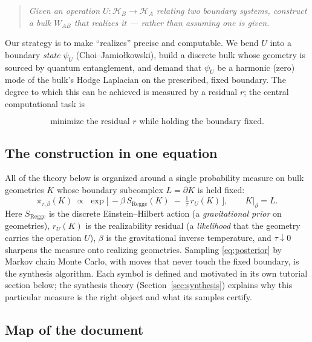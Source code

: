 \documentclass[11pt]{article}
\newcommand{\HH}{\mathcal{H}}
\newcommand{\bd}{\partial}
\theoremstyle{definition}
\theoremstyle{plain}
\begin{document}
\begin{quote}
\itshape Given an operation $U:\HH_B\to\HH_A$ relating two boundary systems, construct a
bulk $W_{AB}$ that realizes it --- rather than assuming one is given.
\end{quote}

Our strategy is to make ``realizes'' precise and computable. We bend $U$ into a boundary
\emph{state} $\psi_U$ (Choi--Jamio\l{}kowski), build a discrete bulk whose geometry is
sourced by quantum entanglement, and demand that $\psi_U$ be a harmonic (zero) mode of the
bulk's Hodge Laplacian on the prescribed, fixed boundary. The degree to which this can be
achieved is measured by a residual $r$; the central computational task is

\begin{equation}
\boxed{\;\text{minimize the residual } r \text{ while holding the boundary fixed.}\;}
\label{eq:goal}
\end{equation}

\subsection{The construction in one equation}

All of the theory below is organized around a single probability measure on bulk geometries
$K$ whose boundary subcomplex $L=\bd K$ is held fixed:
\begin{equation}
\pi_{\tau,\beta}(K)\;\propto\;
\exp\!\Big[\,-\beta\,S_{\mathrm{Regge}}(K)\;-\;\tfrac{1}{\tau}\,r_U(K)\,\Big],
\qquad K\big|_{\bd}=L .
\label{eq:posterior}
\end{equation}
Here $S_{\mathrm{Regge}}$ is the discrete Einstein--Hilbert action (a \emph{gravitational
prior} on geometries), $r_U(K)$ is the realizability residual (a \emph{likelihood} that the
geometry carries the operation $U$), $\beta$ is the gravitational inverse temperature, and
$\tau\downarrow 0$ sharpens the measure onto realizing geometries. Sampling
\eqref{eq:posterior} by Markov chain Monte Carlo, with moves that never touch the fixed
boundary, is the synthesis algorithm. Each symbol is defined and motivated in its own
tutorial section below; the synthesis theory (Section~\ref{sec:synthesis}) explains why this
particular measure is the right object and what its samples certify.

\subsection{Map of the document}
\end{document}
